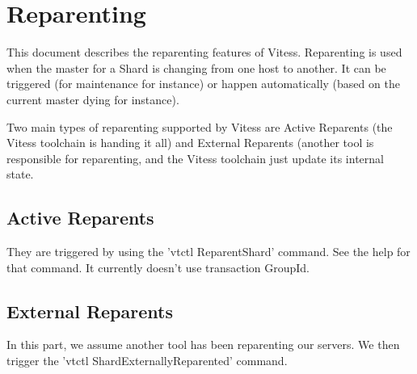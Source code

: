 \section{Reparenting}\hypertarget{reparenting}{}\label{reparenting}

This document describes the reparenting features of Vitess. Reparenting is used when the master for a Shard is
changing from one host to another. It can be triggered (for maintenance for instance) or happen automatically
(based on the current master dying for instance).

Two main types of reparenting supported by Vitess are Active Reparents (the Vitess toolchain is handing it all)
and External Reparents (another tool is responsible for reparenting, and the Vitess toolchain just update its
internal state.

\subsection{Active Reparents}\hypertarget{active-reparents}{}\label{active-reparents}

They are triggered by using the 'vtctl ReparentShard' command. See the help for that command. It currently doesn't use transaction GroupId.

\subsection{External Reparents}\hypertarget{external-reparents}{}\label{external-reparents}

In this part, we assume another tool has been reparenting our servers. We then trigger the
'vtctl ShardExternallyReparented' command.

